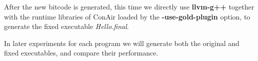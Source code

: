 After the new bitcode is generated, this time we directly use \textbf{llvm-g++}
together with the runtime libraries of ConAir loaded by the
\textbf{-use-gold-plugin} option, to generate the fixed executable
\textit{Hello.final}.

In later experiments for each program we will generate both the original and
fixed executables, and compare their performance.

